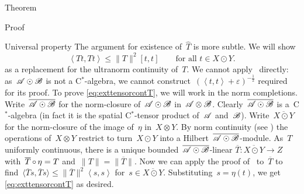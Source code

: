 \documentclass[b]{subfiles}
\begin{document}
\begin{parsec}
\begin{point}{Theorem}
\begin{point}{Proof}
\begin{point}{Universal property}
The argument for existence of~$\hat{T}$ is more subtle.
We will show
\begin{equation}\label{eq:exttensorcontT}
    \left<T t, T t\right> \leq \|T\|^2 [t,t]
        \qquad \text{for all~$t \in X \odot Y$}.
\end{equation}
as a replacement for the ultranorm continuity of~$T$.
We cannot apply~ directly:
    as~$\mathscr{A} \odot \mathscr{B}$ is not a C$^*$-algebra,
    we cannot construct~$(\left<t,t\right>+\varepsilon)^{-\frac{1}{2}}$
    required for its proof.
To prove \eqref{eq:exttensorcontT}, we will work in the norm completions.
Write~$\overline{\mathscr{A} \odot \mathscr{B}}$
    for the norm-closure of~$\mathscr{A} \odot \mathscr{B}$ in~$\mathscr{A} \otimes \mathscr{B}$.
Clearly~$\overline{\mathscr{A} \odot \mathscr{B}}$
    is a~C$^*$-algebra
    (in fact it is the spatial C$^*$-tensor product of~$\mathscr{A}$ and~$\mathscr{B}$).
Write~$\overline{X \odot Y}$
    for the norm-closure of the image of~$\eta$ in~$X \otimes Y$.
By norm continuity
    (see )
    the operations of~$X \otimes Y$
    restrict to turn~$X \odot Y$ into a
    Hilbert~$\overline{\mathscr{A} \odot \mathscr{B}}$-module.
As~$T$ uniformly continuous,
    there is a unique bounded~$\overline{\mathscr{A}\odot\mathscr{B}}$-linear
    $\overline{T}\colon \overline{X\odot Y} \to Z$
    with~$\overline{T} \mathop{\circ} \eta = T$ and~$\|T\| = \|\overline{T}\|$.
Now we can apply the proof of~
    to~$\overline{T}$
    to find~$\langle \overline{T}s,\overline{T}s\rangle \leq
    \|\overline{T}\|^2\left<s,s\right>$
    for~$s \in \overline{X \odot Y}$.
Substituting~$s = \eta(t)$,
    we get \eqref{eq:exttensorcontT} as desired.


\end{point}
\end{point}
\end{point}
\end{parsec}
\end{document}
